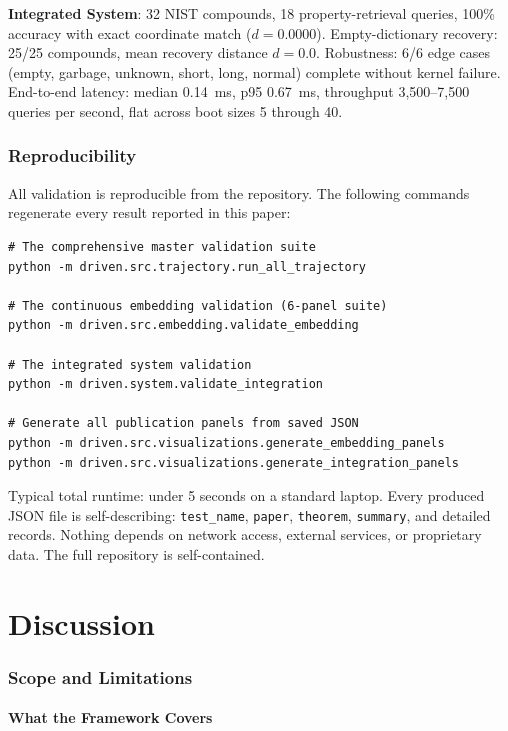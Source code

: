 \documentclass[twocolumn,11pt,a4paper]{article}
\begin{document}
\textbf{Integrated System}: 32 NIST compounds, 18 property-retrieval queries, 100\% accuracy with exact coordinate match ($d = 0.0000$). Empty-dictionary recovery: 25/25 compounds, mean recovery distance $d = 0.0$. Robustness: 6/6 edge cases (empty, garbage, unknown, short, long, normal) complete without kernel failure. End-to-end latency: median 0.14~ms, p95 0.67~ms, throughput 3,500--7,500 queries per second, flat across boot sizes 5 through 40.


\section{Reproducibility}
\label{sec:reproducibility}

All validation is reproducible from the repository. The following commands regenerate every result reported in this paper:

\begin{verbatim}
# The comprehensive master validation suite
python -m driven.src.trajectory.run_all_trajectory

# The continuous embedding validation (6-panel suite)
python -m driven.src.embedding.validate_embedding

# The integrated system validation
python -m driven.system.validate_integration

# Generate all publication panels from saved JSON
python -m driven.src.visualizations.generate_embedding_panels
python -m driven.src.visualizations.generate_integration_panels
\end{verbatim}

Typical total runtime: under 5 seconds on a standard laptop. Every produced JSON file is self-describing: \texttt{test\_name}, \texttt{paper}, \texttt{theorem}, \texttt{summary}, and detailed records. Nothing depends on network access, external services, or proprietary data. The full repository is self-contained.


\part{Discussion}

\section{Scope and Limitations}
\label{sec:discussion}

\subsection{What the Framework Covers}
\end{document}
